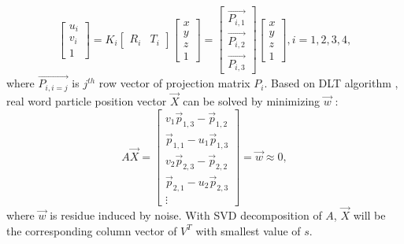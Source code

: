 \documentclass[draftthesis,fullpage]{uiucthesis}
\begin{document}
\begin{equation}
       \left[\begin{array}{c}
              u_i \\
              v _i\\
              1
              \end{array}\right]=K_i\left[\begin{array}{ll}
              R_i & T_i
              \end{array}\right]\left[\begin{array}{c}
              x \\
              y \\
              z \\
              1
              \end{array}\right] = \left[\begin{array}{c}
                     \overrightarrow{P_{i,1}}\\
                     \overrightarrow{P_{i,2}}\\
                     \overrightarrow{P_{i,3}}
              \end{array}\right] \left[\begin{array}{c}
                     x \\
                     y \\
                     z \\
                     1
                     \end{array}\right]      , i = 1,2,3,4,
\end{equation}
where $\overrightarrow{P_{i,i=j}}$ is $j^{th}$ row vector of projection matrix \textbf{$P_i$}. Based on DLT algorithm \citep{shapiro1978direct}, real word particle position vector $\overrightarrow{X}$ can be solved by minimizing $\vec{w}$ :
\begin{equation}
       A \vec{X}=\left[\begin{array}{c}
       v_1 \vec{p}_{1,3}-\vec{p}_{1,2} \\
       \vec{p}_{1,1}-u_1 \vec{p}_{1,3} \\
       v_2 \vec{p}_{2,3}-\vec{p}_{2,2} \\
       \vec{p}_{2,1}-u_2 \vec{p}_{2,3} \\
       \vdots
       \end{array}\right] = \vec{w} \approx 0,
\end{equation}
where $\vec{w}$ is residue induced by noise. With SVD decomposition of $A$,  $\overrightarrow{X}$ will be the corresponding column vector of $V^T$ with smallest value of $s$. 
\end{document}
